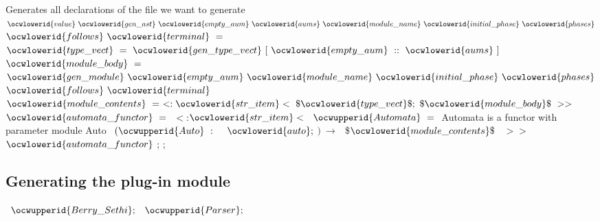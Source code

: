 \documentclass[12pt]{article}
\begin{document}
\ocwendcode{}\ocwindent{0.00em}
Generates all declarations of the file we want to generate 
\ocweol
\label{../ML/regular.ml:24247}%
\medskip
\ocwbegincode{}\ocwindent{0.00em}
$\ocwlowerid{value}~\ocwlowerid{gen\_ast}~\ocwlowerid{empty\_aum}~\ocwlowerid{aums}~\ocwlowerid{module\_name}~\ocwlowerid{initial\_phase}~\ocwlowerid{phases}$\ocweol
\ocwindent{7.00em}
$\ocwlowerid{follows}~\ocwlowerid{terminal}~=~$\ocweol
\ocwindent{1.00em}
~$\ocwlowerid{type\_vect}~=~\ocwlowerid{gen\_type\_vect}~[~\ocwlowerid{empty\_aum}~::~\ocwlowerid{aums}~]~$\ocweol
\ocwindent{1.00em}
~$\ocwlowerid{module\_body}~=~$\ocweol
\ocwindent{2.00em}
$\ocwlowerid{gen\_module}~\ocwlowerid{empty\_aum}~\ocwlowerid{module\_name}~\ocwlowerid{initial\_phase}~\ocwlowerid{phases}$\ocweol
\ocwindent{7.50em}
$\ocwlowerid{follows}~\ocwlowerid{terminal}~$\ocweol
\ocwindent{1.00em}
~$\ocwlowerid{module\_contents}~=~\ensuremath{<}:\ocwlowerid{str\_item}<~\$\ocwlowerid{type\_vect}\$;~\$\ocwlowerid{module\_body}\$~\ensuremath{>}\ensuremath{>}~$\ocweol
\ocwindent{1.00em}
~$\ocwlowerid{automata\_functor}~=~$\ocweol
\ocwindent{3.00em}
\ensuremath{<}:$\ocwlowerid{str\_item}<~$~$\ocwupperid{Automata}~=~$\ocweol
\ocwindent{4.00em}
\ocwbc{} Automata is a functor with parameter module Auto \ocwec{}\ocweol
\ocwindent{4.00em}
~$(\ocwupperid{Auto}~:~$~~$\ocwlowerid{auto};~$$)~\rightarrow{}~$~\$$\ocwlowerid{module\_contents}\$~$~\ensuremath{>}\ensuremath{>}~\ocweol
\ocwindent{1.00em}
$\ocwlowerid{automata\_functor}$\ocweol
\ocwindent{0.00em}
;\ocweol
\ocwindent{0.00em}
;\medskip

\ocwendcode{}\ocwindent{0.00em}
\subsection{Generating the plug-in module} 
\ocweol
\label{../ML/regular.ml:24868}%
\medskip
\ocwbegincode{}\ocwindent{0.00em}
~$\ocwupperid{Berry\_Sethi};$\ocweol
\ocwindent{0.00em}
~$\ocwupperid{Parser};$\medskip
\end{document}
